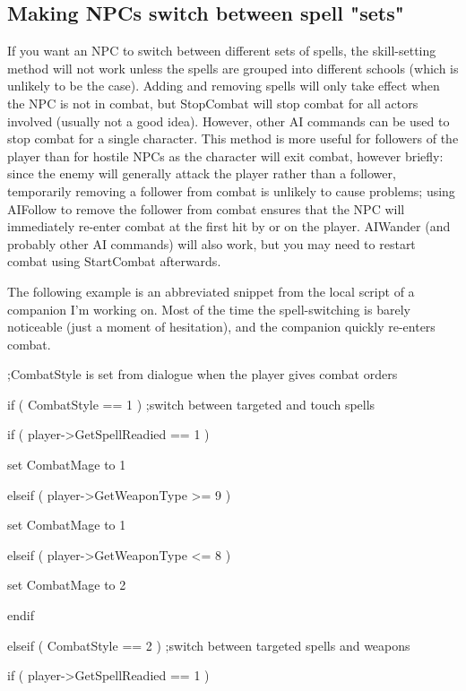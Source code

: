 \documentclass[
]{article}
\begin{document}


\hypertarget{making-npcs-switch-between-spell-sets}{%
\subsection{Making NPCs switch between spell
"sets"}\label{making-npcs-switch-between-spell-sets}}

If you want an NPC to switch between different sets of spells, the
skill-setting method will not work unless the spells are grouped into
different schools (which is unlikely to be the case). Adding and
removing spells will only take effect when the NPC is not in combat, but
StopCombat will stop combat for all actors involved (usually not a good
idea). However, other AI commands can be used to stop combat for a
single character. This method is more useful for followers of the player
than for hostile NPCs as the character will exit combat, however
briefly: since the enemy will generally attack the player rather than a
follower, temporarily removing a follower from combat is unlikely to
cause problems; using AIFollow to remove the follower from combat
ensures that the NPC will immediately re-enter combat at the first hit
by or on the player. AIWander (and probably other AI commands) will also
work, but you may need to restart combat using StartCombat afterwards.

The following example is an abbreviated snippet from the local script of
a companion I'm working on. Most of the time the spell-switching is
barely noticeable (just a moment of hesitation), and the companion
quickly re-enters combat.

;CombatStyle is set from dialogue when the player gives combat orders

if ( CombatStyle == 1 ) ;switch between targeted and touch spells

if ( player-\textgreater GetSpellReadied == 1 )

set CombatMage to 1

elseif ( player-\textgreater GetWeaponType \textgreater= 9 )

set CombatMage to 1

elseif ( player-\textgreater GetWeaponType \textless= 8 )

set CombatMage to 2

endif

elseif ( CombatStyle == 2 ) ;switch between targeted spells and weapons

if ( player-\textgreater GetSpellReadied == 1 )
\end{document}
